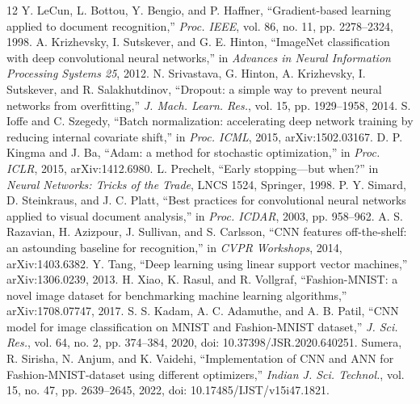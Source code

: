 \documentclass[conference]{IEEEtran}
\begin{document}
\begin{thebibliography}{12}
 Y. LeCun, L. Bottou, Y. Bengio, and P. Haffner, ``Gradient-based learning applied to document recognition,'' \emph{Proc. IEEE}, vol. 86, no. 11, pp. 2278--2324, 1998.
 A. Krizhevsky, I. Sutskever, and G. E. Hinton, ``ImageNet classification with deep convolutional neural networks,'' in \emph{Advances in Neural Information Processing Systems 25}, 2012.
 N. Srivastava, G. Hinton, A. Krizhevsky, I. Sutskever, and R. Salakhutdinov, ``Dropout: a simple way to prevent neural networks from overfitting,'' \emph{J. Mach. Learn. Res.}, vol. 15, pp. 1929--1958, 2014.
 S. Ioffe and C. Szegedy, ``Batch normalization: accelerating deep network training by reducing internal covariate shift,'' in \emph{Proc. ICML}, 2015, arXiv:1502.03167.
 D. P. Kingma and J. Ba, ``Adam: a method for stochastic optimization,'' in \emph{Proc. ICLR}, 2015, arXiv:1412.6980.
 L. Prechelt, ``Early stopping---but when?'' in \emph{Neural Networks: Tricks of the Trade}, LNCS 1524, Springer, 1998.
 P. Y. Simard, D. Steinkraus, and J. C. Platt, ``Best practices for convolutional neural networks applied to visual document analysis,'' in \emph{Proc. ICDAR}, 2003, pp. 958--962.
 A. S. Razavian, H. Azizpour, J. Sullivan, and S. Carlsson, ``CNN features off-the-shelf: an astounding baseline for recognition,'' in \emph{CVPR Workshops}, 2014, arXiv:1403.6382.
 Y. Tang, ``Deep learning using linear support vector machines,'' arXiv:1306.0239, 2013.
 H. Xiao, K. Rasul, and R. Vollgraf, ``Fashion-MNIST: a novel image dataset for benchmarking machine learning algorithms,'' arXiv:1708.07747, 2017.
 S. S. Kadam, A. C. Adamuthe, and A. B. Patil, ``CNN model for image classification on MNIST and Fashion-MNIST dataset,'' \emph{J. Sci. Res.}, vol. 64, no. 2, pp. 374--384, 2020, doi: 10.37398/JSR.2020.640251.
 Sumera, R. Sirisha, N. Anjum, and K. Vaidehi, ``Implementation of CNN and ANN for Fashion-MNIST-dataset using different optimizers,'' \emph{Indian J. Sci. Technol.}, vol. 15, no. 47, pp. 2639--2645, 2022, doi: 10.17485/IJST/v15i47.1821.
\end{thebibliography}
\end{document}

